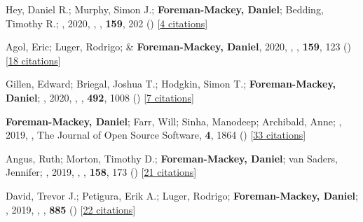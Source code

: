 \item[{\color{numcolor}\scriptsize54}] Hey, Daniel R.; Murphy, Simon J.; \textbf{Foreman-Mackey, Daniel}; Bedding, Timothy R.; \etal, 2020, , \aj, \textbf{159}, 202 () [\href{https://ui.adsabs.harvard.edu/abs/2020AJ....159..202H}{4 citations}]

\item[{\color{numcolor}\scriptsize53}] Agol, Eric; Luger, Rodrigo; \& \textbf{Foreman-Mackey, Daniel}, 2020, , \aj, \textbf{159}, 123 () [\href{https://ui.adsabs.harvard.edu/abs/2020AJ....159..123A}{18 citations}]

\item[{\color{numcolor}\scriptsize52}] Gillen, Edward; Briegal, Joshua T.; Hodgkin, Simon T.; \textbf{Foreman-Mackey, Daniel}; \etal, 2020, , \mnras, \textbf{492}, 1008 () [\href{https://ui.adsabs.harvard.edu/abs/2020MNRAS.492.1008G}{7 citations}]

\item[{\color{numcolor}\scriptsize51}] \textbf{Foreman-Mackey, Daniel}; Farr, Will; Sinha, Manodeep; Archibald, Anne; \etal, 2019, , The Journal of Open Source Software, \textbf{4}, 1864 () [\href{https://ui.adsabs.harvard.edu/abs/2019JOSS....4.1864F}{33 citations}]

\item[{\color{numcolor}\scriptsize50}] Angus, Ruth; Morton, Timothy D.; \textbf{Foreman-Mackey, Daniel}; van Saders, Jennifer; \etal, 2019, , \aj, \textbf{158}, 173 () [\href{https://ui.adsabs.harvard.edu/abs/2019AJ....158..173A}{21 citations}]

\item[{\color{numcolor}\scriptsize49}] David, Trevor J.; Petigura, Erik A.; Luger, Rodrigo; \textbf{Foreman-Mackey, Daniel}; \etal, 2019, , \apj, \textbf{885} () [\href{https://ui.adsabs.harvard.edu/abs/2019ApJ...885L..12D}{22 citations}]

